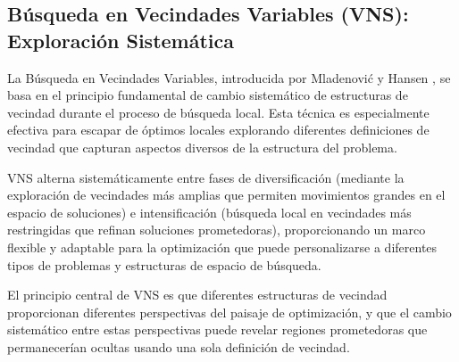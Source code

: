 \subsection{Búsqueda en Vecindades Variables (VNS): Exploración Sistemática}

La Búsqueda en Vecindades Variables, introducida por Mladenović y Hansen \cite{mladenovic1997variable}, se basa en el principio fundamental de cambio sistemático de estructuras de vecindad durante el proceso de búsqueda local. Esta técnica es especialmente efectiva para escapar de óptimos locales explorando diferentes definiciones de vecindad que capturan aspectos diversos de la estructura del problema.

VNS alterna sistemáticamente entre fases de diversificación (mediante la exploración de vecindades más amplias que permiten movimientos grandes en el espacio de soluciones) e intensificación (búsqueda local en vecindades más restringidas que refinan soluciones prometedoras), proporcionando un marco flexible y adaptable para la optimización que puede personalizarse a diferentes tipos de problemas y estructuras de espacio de búsqueda.

El principio central de VNS es que diferentes estructuras de vecindad proporcionan diferentes perspectivas del paisaje de optimización, y que el cambio sistemático entre estas perspectivas puede revelar regiones prometedoras que permanecerían ocultas usando una sola definición de vecindad.

